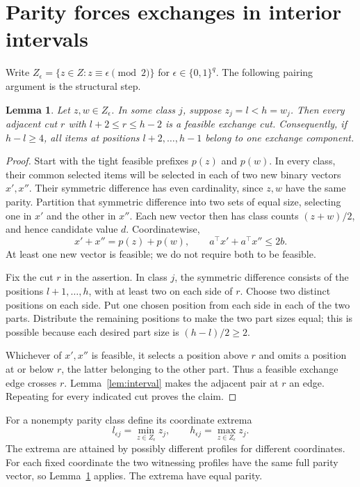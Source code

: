 \documentclass[11pt]{article}
\newtheorem{lemma}[theorem]{Lemma}
\begin{document}
\section{Parity forces exchanges in interior intervals}
Write $Z_\epsilon=\{z\in Z:z\equiv\epsilon\pmod2\}$ for $\epsilon\in\{0,1\}^q$. The following pairing argument is the structural step.
\begin{lemma}\label{lem:pair}
Let $z,w\in Z_\epsilon$. In some class $j$, suppose $z_j=l<h=w_j$. Then every adjacent cut $r$ with $l+2\le r\le h-2$ is a feasible exchange cut. Consequently, if $h-l\ge4$, all items at positions $l+2,\ldots,h-1$ belong to one exchange component.
\end{lemma}
\begin{proof}
Start with the tight feasible prefixes $p(z)$ and $p(w)$. In every class, their common selected items will be selected in each of two new binary vectors $x',x''$. Their symmetric difference has even cardinality, since $z,w$ have the same parity. Partition that symmetric difference into two sets of equal size, selecting one in $x'$ and the other in $x''$. Each new vector then has class counts $(z+w)/2$, and hence candidate value $d$. Coordinatewise,
\[
 x'+x''=p(z)+p(w),\qquad a^\top x'+a^\top x''\le2b.
\]
At least one new vector is feasible; we do not require both to be feasible.

Fix the cut $r$ in the assertion. In class $j$, the symmetric difference consists of the positions $l+1,\ldots,h$, with at least two on each side of $r$. Choose two distinct positions on each side. Put one chosen position from each side in each of the two parts. Distribute the remaining positions to make the two part sizes equal; this is possible because each desired part size is $(h-l)/2\ge2$.

Whichever of $x',x''$ is feasible, it selects a position above $r$ and omits a position at or below $r$, the latter belonging to the other part. Thus a feasible exchange edge crosses $r$. Lemma~\ref{lem:interval} makes the adjacent pair at $r$ an edge. Repeating for every indicated cut proves the claim.
\end{proof}

For a nonempty parity class define its coordinate extrema
\[
 l_{\epsilon j}=\min_{z\in Z_\epsilon}z_j,\qquad
 h_{\epsilon j}=\max_{z\in Z_\epsilon}z_j.
\]
The extrema are attained by possibly different profiles for different coordinates. For each fixed coordinate the two witnessing profiles have the same full parity vector, so Lemma~\ref{lem:pair} applies. The extrema have equal parity.
\end{document}
